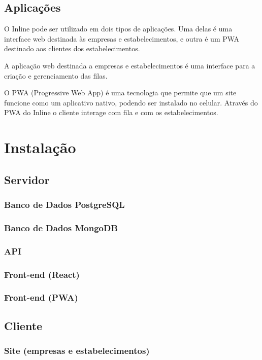 \documentclass{book}
\begin{document}
\section{Aplicações}
O Inline pode ser utilizado em dois tipos de aplicações. Uma delas é uma
interface web destinada às empresas e estabelecimentos, e outra é um PWA
destinado aos clientes dos estabelecimentos.

A aplicação web destinada a empresas e estabelecimentos é uma interface para a
criação e gerenciamento das filas.

O PWA (Progressive Web App) é uma tecnologia que permite que um site funcione
como um aplicativo nativo, podendo ser instalado no celular. Através do PWA
do Inline o cliente interage com fila e com os estabelecimentos.

\chapter{Instalação}

\section{Servidor}
\subsection{Banco de Dados PostgreSQL}
\subsection{Banco de Dados MongoDB}
\subsection{API}
\subsection{Front-end (React)}
\subsection{Front-end (PWA)}

\section{Cliente}
\subsection{Site (empresas e estabelecimentos)}
\end{document}
